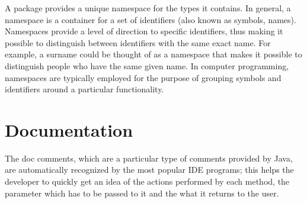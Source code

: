 A package provides a unique namespace for the types it contains.
In general, a namespace is a container for a set of identifiers (also known as symbols, names). Namespaces provide a level of direction to specific identifiers, thus making it possible to distinguish between identifiers with the same exact name. For example, a surname could be thought of as a namespace that makes it possible to distinguish people who have the same given name. In computer programming, namespaces are typically employed for the purpose of grouping symbols and identifiers around a particular functionality.
\section{Documentation}
The doc comments, which are a particular type of comments provided by Java, are automatically recognized by the most popular IDE programs; this helps the developer to quickly get an idea of the actions performed by each method, the parameter which has to be passed to it and the what it returns to the user.


